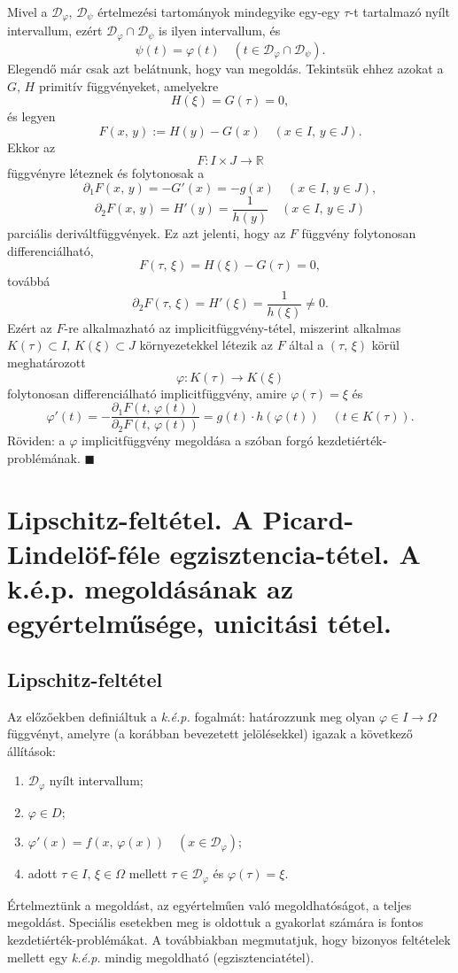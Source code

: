 \documentclass[12pt]{article}
\newcommand{\R}{\mathbb{R}}
\newcommand{\Dp}{\mathcal{D}_\varphi}
\begin{document}
    Mivel a $\Dp, \, \mathcal{D}_\psi$ értelmezési tartományok mindegyike egy-egy $\tau$-t tartalmazó nyílt intervallum, ezért $\Dp \cap \mathcal{D}_\psi$ is ilyen intervallum, és
    \[
        \psi(t) = \varphi(t) \quad (t \in \Dp \cap \mathcal{D}_\psi).
    \]
    Elegendő már csak azt belátnunk, hogy van megoldás. Tekintsük ehhez azokat a $G, \, H$ primitív függvényeket, amelyekre
    \[
        H(\xi) = G(\tau) = 0,
    \]
    és legyen
    \[
        F(x, \, y) := H(y) - G(x) \quad (x \in I, \, y \in J).
    \]
    Ekkor az
    \[
        F : I \times J \to \R
    \]
    függvényre léteznek és folytonosak a
    \[
        \partial_1 F(x, \, y) = -G'(x) = -g(x) \quad (x \in I, \, y \in J),
    \]
    \[
        \partial_2 F(x, \, y) = H'(y) = \frac{1}{h(y)} \quad (x \in I, \, y \in J)
    \]
    parciális deriváltfüggvények. Ez azt jelenti, hogy az $F$ függvény folytonosan differenciálható,
    \[
        F(\tau, \, \xi) = H(\xi) - G(\tau) = 0,
    \]
    továbbá
    \[
        \partial_2 F(\tau, \, \xi) = H'(\xi) = \frac{1}{h(\xi)} \neq 0.
    \]
    Ezért az $F$-re alkalmazható az implicitfüggvény-tétel, miszerint alkalmas $K(\tau) \subset I, \, K(\xi) \subset J$ környezetekkel létezik az $F$ által a $(\tau, \, \xi)$ körül meghatározott
    \[
        \varphi : K(\tau) \to K(\xi)
    \]
    folytonosan differenciálható implicitfüggvény, amire $\varphi(\tau) = \xi$ és
    \[
        \varphi'(t) = -\frac{\partial_1 F(t, \, \varphi(t))}{\partial_2 F(t, \, \varphi(t))} = g(t) \cdot h(\varphi(t)) \quad (t \in K(\tau)).
    \]
    Röviden: a $\varphi$ implicitfüggvény megoldása a szóban forgó kezdetiérték-problémának. $\blacksquare$


    \newpage
    \section{Lipschitz-feltétel. A Picard-Lindelöf-féle egzisztencia-tétel. A k.é.p. megoldásának az egyértelműsége, unicitási tétel.}
    \subsection{Lipschitz-feltétel}
    Az előzőekben definiáltuk a \textit{k.é.p.} fogalmát: határozzunk meg olyan $\varphi \in I \to \Omega$ függvényt, amelyre (a korábban bevezetett jelölésekkel) igazak a következő állítások:
    \begin{enumerate}
        \item $\mathcal{D}_\varphi$ nyílt intervallum;
        \item $\varphi \in D$;
        \item $\varphi'(x) = f(x, \, \varphi(x)) \quad (x \in \Dp)$;
        \item adott $\tau \in I, \, \xi \in \Omega$ mellett $\tau \in \Dp$ és $\varphi(\tau) = \xi$.
    \end{enumerate}
    Értelmeztünk a megoldást, az egyértelműen való megoldhatóságot, a teljes megoldást. Speciális esetekben meg is oldottuk a gyakorlat számára is fontos kezdetiérték-problémákat. A továbbiakban megmutatjuk, hogy bizonyos feltételek mellett egy \textit{k.é.p.} mindig megoldható (egzisztenciatétel).\\
\end{document}
